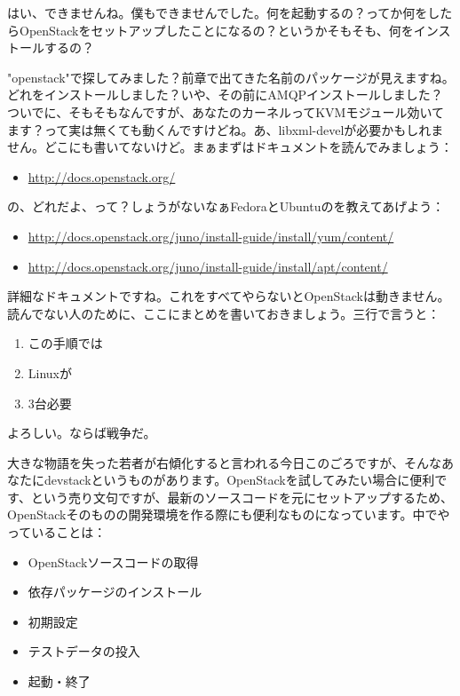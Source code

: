 \documentclass[9pt,b5paper,tombo,openany]{jsbook}
\begin{document}
はい、できませんね。僕もできませんでした。何を起動するの？ってか何をしたらOpenStackをセットアップしたことになるの？というかそもそも、何をインストールするの？

"openstack"で探してみました？前章で出てきた名前のパッケージが見えますね。どれをインストールしました？いや、その前にAMQPインストールしました？ついでに、そもそもなんですが、あなたのカーネルってKVMモジュール効いてます？って実は無くても動くんですけどね。あ、libxml-develが必要かもしれません。どこにも書いてないけど。まぁまずはドキュメントを読んでみましょう：

\begin{itemize}
  \item \url{http://docs.openstack.org/}
\end{itemize}

の、どれだよ、って？しょうがないなぁFedoraとUbuntuのを教えてあげよう：

\begin{itemize}
  \item \url{http://docs.openstack.org/juno/install-guide/install/yum/content/}
  \item \url{http://docs.openstack.org/juno/install-guide/install/apt/content/}
\end{itemize}

詳細なドキュメントですね。これをすべてやらないとOpenStackは動きません。読んでない人のために、ここにまとめを書いておきましょう。三行で言うと：

\begin{enumerate}
  \item この手順では
  \item Linuxが
  \item 3台必要
\end{enumerate}

よろしい。ならば戦争だ。

大きな物語を失った若者が右傾化すると言われる今日このごろですが、そんなあなたにdevstackというものがあります。OpenStackを試してみたい場合に便利です、という売り文句ですが、最新のソースコードを元にセットアップするため、OpenStackそのものの開発環境を作る際にも便利なものになっています。中でやっていることは：

\begin{itemize}
  \item OpenStackソースコードの取得
  \item 依存パッケージのインストール
  \item 初期設定
  \item テストデータの投入
  \item 起動・終了
\end{itemize}
\end{document}
